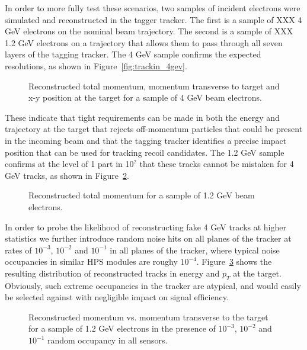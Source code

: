 In order to more fully test these scenarios, two samples of incident electrons were simulated and reconstructed in the tagger tracker.  The first is a sample of XXX 4 GeV electrons on the nominal beam trajectory.  The second is a sample of XXX 1.2 GeV electrons on a trajectory that allows them to pass through all seven layers of the tagging tracker.  The 4 GeV sample confirms the expected resolutions, as shown in Figure~\ref{fig:trackin_4gev}.  
\begin{figure}[htp]
\begin{center}
\caption{\small{Reconstructed total momentum, momentum transverse to target and x-y position at the target for a sample of 4 GeV beam electrons.} }
\label{fig:tracking_4gev}
\end{center}
\end{figure}
These indicate that tight requirements can be made in both the energy and trajectory at the target that rejects off-momentum particles that could be present in the incoming beam and that the tagging tracker identifies a precise impact position that can be used for tracking recoil candidates.  The 1.2 GeV sample confirms at the level of 1 part in 10$^?$ that these tracks cannot be mistaken for 4 GeV tracks, as shown in Figure~\ref{fig:tracking_1pt2gev}.  
\begin{figure}[htp]
\begin{center}
\caption{\small{Reconstructed total momentum for a sample of 1.2 GeV beam electrons.} }
\label{fig:tracking_1pt2gev}
\end{center}
\end{figure}
In order to probe the likelihood of reconstructing fake 4 GeV tracks at higher statistics we further introduce random noise hits on all planes of the tracker at rates of $10^{-3}$, $10^{-2}$ and $10^{-1}$ in all planes of the tracker, where typical noise occupancies in similar HPS modules are roughy $10^{-4}$. Figure~\ref{fig:tracking_1pt2gev_noise} shows the resulting distribution of reconstructed tracks in energy and $p_T$ at the target. Obviously, such extreme occupancies in the tracker are atypical, and would easily be selected against with negligible impact on signal efficiency. 
\begin{figure}[htp]
\begin{center}
\caption{\small{Reconstructed momentum vs. momentum transverse to the target for a sample of 1.2 GeV electrons in the presence of $10^{-3}$, $10^{-2}$ and $10^{-1}$ random occupancy in all sensors.} }
\label{fig:tracking_1pt2gev_noise}
\end{center}
\end{figure}
